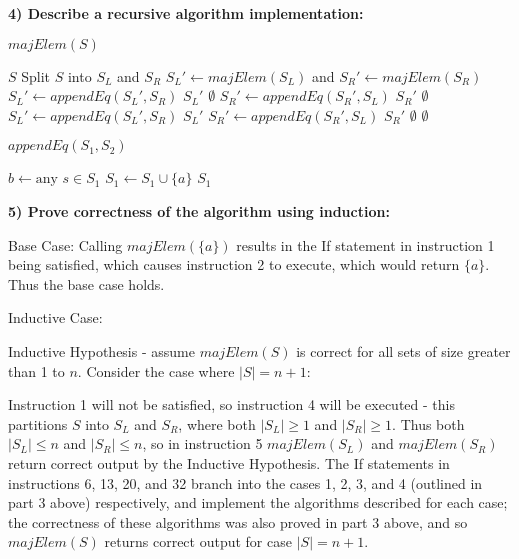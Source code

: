\documentclass{article}
\begin{document}
\textbf{4) Describe a recursive algorithm implementation:}

$majElem(S)$
\begin{algorithmic}[1]
	\RETURN $S$
\ELSE 
	\STATE Split $S$ into $S_L$ and $S_R$
	\STATE $S_L' \gets majElem(S_L)$ and $S_R' \gets majElem(S_R)$
		\STATE $S_L' \gets appendEq(S_L',S_R)$
			\RETURN $S_L'$
		\ELSE
			\RETURN $\emptyset$
		\ENDIF
		\STATE $S_R' \gets appendEq(S_R',S_L)$
			\RETURN $S_R'$
		\ELSE
			\RETURN $\emptyset$
		\ENDIF
		\STATE $S_L' \gets appendEq(S_L',S_R)$
			\RETURN $S_L'$
		\ELSE
			\STATE $S_R' \gets appendEq(S_R',S_L)$
				\RETURN $S_R'$
			\ELSE
				\RETURN $\emptyset$
			\ENDIF
		\ENDIF
	\ELSE
		\RETURN $\emptyset$
	\ENDIF
\ENDIF
\end{algorithmic}

$appendEq(S_1, S_2)$
\begin{algorithmic}[1]
\STATE $b \gets \text{any } s \in S_1$
		\STATE $S_1 \gets S_1 \cup \{a\}$
	\ENDIF
\ENDFOR
\RETURN $S_1$
\end{algorithmic}

\textbf{5) Prove correctness of the algorithm using induction:}

Base Case: Calling $majElem(\{a\})$ results in the If statement in instruction
1 being satisfied, which causes instruction 2 to execute, which would return
$\{a\}$. Thus the base case holds.

Inductive Case:

Inductive Hypothesis - assume $majElem(S)$ is correct for all sets of size
greater than 1 to $n$. Consider the case where $|S| = n+1$:

Instruction 1 will not be satisfied, so instruction 4 will be executed - this
partitions $S$ into $S_L$ and $S_R$, where both $|S_L| \geq 1$ and $|S_R| \geq
1$. Thus both $|S_L| \leq n$ and $|S_R| \leq n$, so in instruction 5
$majElem(S_L)$ and $majElem(S_R)$ return correct output by the Inductive
Hypothesis. The If statements in instructions 6, 13, 20, and 32 branch into the
cases 1, 2, 3, and 4 (outlined in part 3 above) respectively, and implement the
algorithms described for each case; the correctness of these algorithms was also
proved in part 3 above, and so $majElem(S)$ returns correct output for case
$|S|=n+1$.
\end{document}
